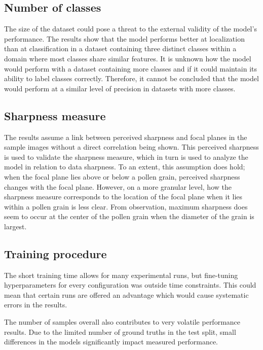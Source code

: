 \subsection{Number of classes}
The size of the dataset could pose a threat to the external validity of the model's performance.
The results show that the model performs better at localization than at classification in a dataset containing three distinct classes within a domain where most classes share similar features.
It is unknown how the model would perform with a dataset containing more classes and if it could maintain its ability to label classes correctly.
Therefore, it cannot be concluded that the model would perform at a similar level of precision in datasets with more classes.

\subsection{Sharpness measure}
The results assume a link between perceived sharpness and focal planes in the sample images without a direct correlation being shown.
This perceived sharpness is used to validate the sharpness measure, which in turn is used to analyze the model in relation to data sharpness.
To an extent, this assumption does hold; when the focal plane lies above or below a pollen grain, perceived sharpness changes with the focal plane.
However, on a more granular level, how the sharpness measure corresponds to the location of the focal plane when it lies within a pollen grain is less clear.
From observation, maximum sharpness does seem to occur at the center of the pollen grain when the diameter of the grain is largest.

\subsection{Training procedure}
The short training time allows for many experimental runs, but fine-tuning hyperparameters for every configuration was outside time constraints.
This could mean that certain runs are offered an advantage which would cause systematic errors in the results.

The number of samples overall also contributes to very volatile performance results.
Due to the limited number of ground truths in the test split, small differences in the models significantly impact measured performance.
